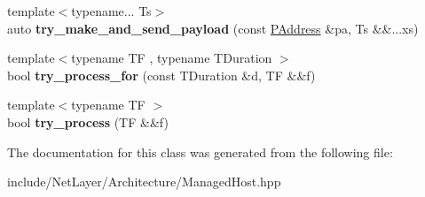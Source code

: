 \begin{DoxyCompactItemize}
\item 
\hypertarget{classnl_1_1ManagedHostImpl_aef1bc53fa9e1f37cf5b0f2842c5babd9}{}{\footnotesize template$<$typename... Ts$>$ }\\auto {\bfseries try\+\_\+make\+\_\+and\+\_\+send\+\_\+payload} (const \hyperlink{structnl_1_1PAddress}{P\+Address} \&pa, Ts \&\&...xs)\label{classnl_1_1ManagedHostImpl_aef1bc53fa9e1f37cf5b0f2842c5babd9}

\item 
\hypertarget{classnl_1_1ManagedHostImpl_a9db9147845f2abccd4a2a24b55322ede}{}{\footnotesize template$<$typename T\+F , typename T\+Duration $>$ }\\bool {\bfseries try\+\_\+process\+\_\+for} (const T\+Duration \&d, T\+F \&\&f)\label{classnl_1_1ManagedHostImpl_a9db9147845f2abccd4a2a24b55322ede}

\item 
\hypertarget{classnl_1_1ManagedHostImpl_ae3b7955e15c744e5bcc4851730e6152d}{}{\footnotesize template$<$typename T\+F $>$ }\\bool {\bfseries try\+\_\+process} (T\+F \&\&f)\label{classnl_1_1ManagedHostImpl_ae3b7955e15c744e5bcc4851730e6152d}

\end{DoxyCompactItemize}


The documentation for this class was generated from the following file\+:\begin{DoxyCompactItemize}
\item 
include/\+Net\+Layer/\+Architecture/Managed\+Host.\+hpp\end{DoxyCompactItemize}

